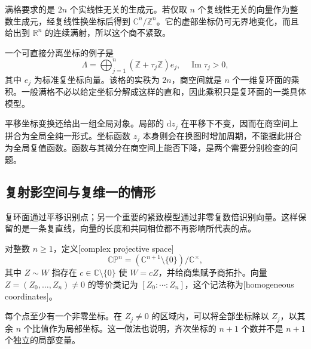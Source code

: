 满格要求的是 \(2n\) 个实线性无关的生成元。若仅取 \(n\) 个复线性无关的向量作为整数生成元，经复线性换坐标后得到 \(\mathbb C^n/\mathbb Z^n\)。它的虚部坐标仍可无界地变化，而且给出到 \(\mathbb R^n\) 的连续满射，所以这个商不紧致。

\ProseParagraphBreak

一个可直接分离坐标的例子是
\[
 \Lambda=\bigoplus_{j=1}^n(\mathbb Z+\tau_j\mathbb Z)e_j,
 \quad \operatorname{Im}\tau_j>0,
\]
其中 \(e_j\) 为标准复坐标向量。该格的实秩为 \(2n\)，商空间就是 \(n\) 个一维复环面的乘积。一般满格不必以给定坐标分解成这样的直和，因此乘积只是复环面的一类具体模型。

\ProseParagraphBreak

平移坐标变换还给出一组全局对象。局部的 \(\mathrm{d}z_j\) 在平移下不变，因而在商空间上拼合为全局全纯一形式。坐标函数 \(z_j\) 本身则会在换图时增加周期，不能据此拼合为全局复值函数。函数与其微分在商空间上能否下降，是两个需要分别检查的问题。

\subsection{复射影空间与复维一的情形}
\label{b3:subsec:290704}

复环面通过平移识别点；另一个重要的紧致模型通过非零复数倍识别向量。这样保留的是一条复直线，向量的长度和共同相位都不再影响所代表的点。

\begin{definition}[复射影空间]\label{b3:def:29-projective-space}
对整数 \(n\ge1\)，定义[complex projective space]
\[
 \mathbb{CP}^n=(\mathbb C^{n+1}\setminus\{0\})/\mathbb C^\times,
\]
其中 \(Z\sim W\) 指存在 \(c\in\mathbb C\setminus\{0\}\) 使 \(W=cZ\)，并给商集赋予商拓扑。向量 \(Z=(Z_0,\ldots,Z_n)\ne0\) 的等价类记为 \([Z_0:\cdots:Z_n]\)，这个记法称为[homogeneous coordinates]。
\end{definition}

每个点至少有一个非零坐标。在 \(Z_j\ne0\) 的区域内，可以将全部坐标除以 \(Z_j\)，以其余 \(n\) 个比值作为局部坐标。这一做法也说明，齐次坐标的 \(n+1\) 个数并不是 \(n+1\) 个独立的局部变量。

